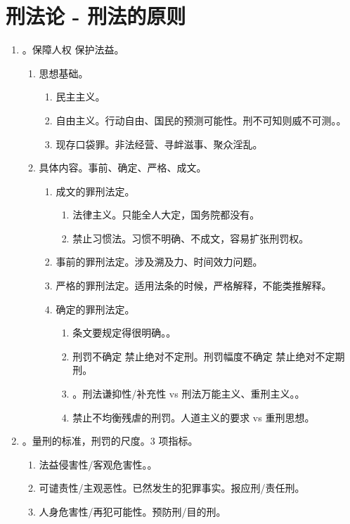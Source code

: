 \section{刑法论 - 刑法的原则}
\begin{enumerate}
  \item {}。保障人权 \dy 保护法益。
        \begin{enumerate}
          \item 思想基础。
                \begin{enumerate}
                  \item 民主主义。
                  \item 自由主义。行动自由、国民的预测可能性。刑不可知则威不可测。。
                  \item 现存口袋罪。非法经营、寻衅滋事、聚众淫乱。
                \end{enumerate}
          \item 具体内容。事前、确定、严格、成文。
                \begin{enumerate}
                  \item 成文的罪刑法定。
                        \begin{enumerate}
                          \item 法律主义。只能全人大定，国务院都没有。
                          \item 禁止习惯法。习惯不明确、不成文，容易扩张刑罚权。
                        \end{enumerate}
                  \item 事前的罪刑法定。涉及溯及力、时间效力问题。
                  \item 严格的罪刑法定。适用法条的时候，严格解释，不能类推解释。
                  \item 确定的罪刑法定。
                        \begin{enumerate}
                          \item 条文要规定得很明确。。
                          \item 刑罚不确定 \yjt 禁止绝对不定刑。刑罚幅度不确定 \yjt 禁止绝对不定期刑。
                          \item {}。刑法谦抑性/补充性 vs 刑法万能主义、重刑主义。。
                          \item 禁止不均衡残虐的刑罚。人道主义的要求 vs 重刑思想。
                        \end{enumerate}
                \end{enumerate}
        \end{enumerate}
  \item {}。量刑的标准，刑罚的尺度。3 项指标。
        \begin{enumerate}
          \item 法益侵害性/客观危害性。。
          \item 可谴责性/主观恶性。\sjt 已然发生的犯罪事实。报应刑/责任刑。
          \item 人身危害性/再犯可能性。预防刑/目的刑。
        \end{enumerate}
\end{enumerate}
